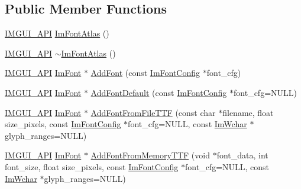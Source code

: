 \subsection*{Public Member Functions}
\begin{DoxyCompactItemize}
\item 
\mbox{\hyperlink{imgui_8h_a43829975e84e45d1149597467a14bbf5}{I\+M\+G\+U\+I\+\_\+\+A\+PI}} \mbox{\hyperlink{struct_im_font_atlas_aa34e7909d30440d5c35aaef990ac741e}{Im\+Font\+Atlas}} ()
\item 
\mbox{\hyperlink{imgui_8h_a43829975e84e45d1149597467a14bbf5}{I\+M\+G\+U\+I\+\_\+\+A\+PI}} \mbox{\hyperlink{struct_im_font_atlas_a950b4f7586ad7786ae251b957d67a268}{$\sim$\+Im\+Font\+Atlas}} ()
\item 
\mbox{\hyperlink{imgui_8h_a43829975e84e45d1149597467a14bbf5}{I\+M\+G\+U\+I\+\_\+\+A\+PI}} \mbox{\hyperlink{struct_im_font}{Im\+Font}} $\ast$ \mbox{\hyperlink{struct_im_font_atlas_ad01c0f19a95d37a9e5ebab1e54525625}{Add\+Font}} (const \mbox{\hyperlink{struct_im_font_config}{Im\+Font\+Config}} $\ast$font\+\_\+cfg)
\item 
\mbox{\hyperlink{imgui_8h_a43829975e84e45d1149597467a14bbf5}{I\+M\+G\+U\+I\+\_\+\+A\+PI}} \mbox{\hyperlink{struct_im_font}{Im\+Font}} $\ast$ \mbox{\hyperlink{struct_im_font_atlas_a9d2b4a94579bf603a0d2662cd8348cbd}{Add\+Font\+Default}} (const \mbox{\hyperlink{struct_im_font_config}{Im\+Font\+Config}} $\ast$font\+\_\+cfg=N\+U\+LL)
\item 
\mbox{\hyperlink{imgui_8h_a43829975e84e45d1149597467a14bbf5}{I\+M\+G\+U\+I\+\_\+\+A\+PI}} \mbox{\hyperlink{struct_im_font}{Im\+Font}} $\ast$ \mbox{\hyperlink{struct_im_font_atlas_a26d0333bae95222ca2c2fd2886eae562}{Add\+Font\+From\+File\+T\+TF}} (const char $\ast$filename, float size\+\_\+pixels, const \mbox{\hyperlink{struct_im_font_config}{Im\+Font\+Config}} $\ast$font\+\_\+cfg=N\+U\+LL, const \mbox{\hyperlink{imgui_8h_af2c7badaf05a0008e15ef76d40875e97}{Im\+Wchar}} $\ast$glyph\+\_\+ranges=N\+U\+LL)
\item 
\mbox{\hyperlink{imgui_8h_a43829975e84e45d1149597467a14bbf5}{I\+M\+G\+U\+I\+\_\+\+A\+PI}} \mbox{\hyperlink{struct_im_font}{Im\+Font}} $\ast$ \mbox{\hyperlink{struct_im_font_atlas_adb01397920998a18e25bd8fed3f791a7}{Add\+Font\+From\+Memory\+T\+TF}} (void $\ast$font\+\_\+data, int font\+\_\+size, float size\+\_\+pixels, const \mbox{\hyperlink{struct_im_font_config}{Im\+Font\+Config}} $\ast$font\+\_\+cfg=N\+U\+LL, const \mbox{\hyperlink{imgui_8h_af2c7badaf05a0008e15ef76d40875e97}{Im\+Wchar}} $\ast$glyph\+\_\+ranges=N\+U\+LL)
\item 

\end{DoxyCompactItemize}
